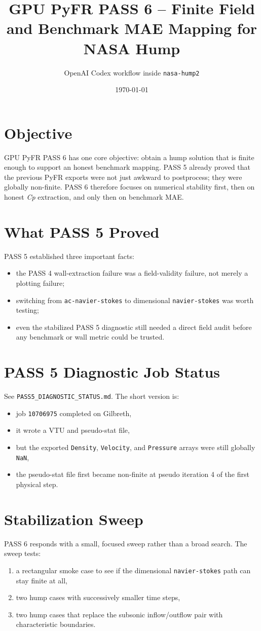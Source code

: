 \documentclass[11pt]{article}
\title{GPU PyFR PASS 6 -- Finite Field and Benchmark MAE Mapping for NASA Hump}
\author{OpenAI Codex workflow inside \texttt{nasa-hump2}}
\date{\today}
\begin{document}
\maketitle

\section{Objective}
GPU PyFR PASS 6 has one core objective: obtain a hump solution that is finite enough to support an honest benchmark mapping. PASS 5 already proved that the previous PyFR exports were not just awkward to postprocess; they were globally non-finite. PASS 6 therefore focuses on numerical stability first, then on honest \textit{Cp} extraction, and only then on benchmark MAE.

\section{What PASS 5 Proved}
PASS 5 established three important facts:
\begin{itemize}
  \item the PASS 4 wall-extraction failure was a field-validity failure, not merely a plotting failure;
  \item switching from \texttt{ac-navier-stokes} to dimensional \texttt{navier-stokes} was worth testing;
  \item even the stabilized PASS 5 diagnostic still needed a direct field audit before any benchmark or wall metric could be trusted.
\end{itemize}

\section{PASS 5 Diagnostic Job Status}
See \texttt{PASS5\_DIAGNOSTIC\_STATUS.md}. The short version is:
\begin{itemize}
  \item job \texttt{10706975} completed on Gilbreth,
  \item it wrote a VTU and pseudo-stat file,
  \item but the exported \texttt{Density}, \texttt{Velocity}, and \texttt{Pressure} arrays were still globally \texttt{NaN},
  \item the pseudo-stat file first became non-finite at pseudo iteration 4 of the first physical step.
\end{itemize}

\section{Stabilization Sweep}
PASS 6 responds with a small, focused sweep rather than a broad search. The sweep tests:
\begin{enumerate}
  \item a rectangular smoke case to see if the dimensional \texttt{navier-stokes} path can stay finite at all,
  \item two hump cases with successively smaller time steps,
  \item two hump cases that replace the subsonic inflow/outflow pair with characteristic boundaries.
\end{enumerate}
\end{document}

